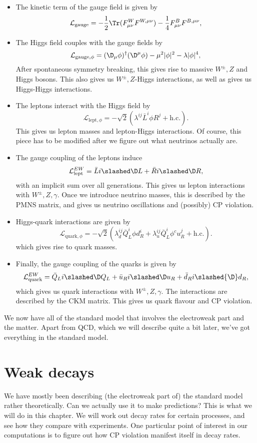 \documentclass[a4paper]{article}
\begin{document}
\begin{itemize}
  \item The kinetic term of the gauge field is given by
    \[
      \mathcal{L}_{\mathrm{gauge}} = -\frac{1}{2} \Tr (F^W_{\mu\nu} F^{W,\mu\nu}) - \frac{1}{4} F_{\mu\nu}^B F^{B, \mu\nu},
    \]
  \item The Higgs field couples with the gauge fields by
    \[
      \mathcal{L}_{\mathrm{gauge}, \phi} = (\D_\mu \phi)^\dagger (\D^\mu \phi) - \mu^2 |\phi|^2 - \lambda |\phi|^4,
    \]
    After spontaneous symmetry breaking, this gives rise to massive $W^{\pm}, Z$ and Higgs bosons. This also gives us $W^{\pm}, Z$-Higgs interactions, as well as gives us Higgs-Higgs interactions.
  \item The leptons interact with the Higgs field by
    \[
      \mathcal{L}_{\mathrm{lept}, \phi} =- \sqrt{2} (\lambda^{ij} \bar L^i \phi R^j + \mathrm{h.c.}).
    \]
    This gives us lepton masses and lepton-Higgs interactions. Of course, this piece has to be modified after we figure out what neutrinos actually are.
  \item The gauge coupling of the leptons induce
    \[
      \mathcal{L}_{\mathrm{lept}}^{EW} = \bar L i \slashed \D L + \bar R i \slashed \D R,
    \]
    with an implicit sum over all generations. This gives us lepton interactions with $W^{\pm}, Z, \gamma$. Once we introduce neutrino masses, this is described by the PMNS matrix, and gives us neutrino oscillations and (possibly) CP violation.
  \item Higgs-quark interactions are given by
    \[
      \mathcal{L}_{\mathrm{quark}, \phi} = - \sqrt{2} (\lambda_d^{ij} \bar{Q}_L^i \phi d_R^i + \lambda_u^{ij} \bar{Q}_L^i \phi^c u_R^j + \mathrm{h.c.}).
    \]
    which gives rise to quark masses.
  \item Finally, the gauge coupling of the quarks is given by
    \[
      \mathcal{L}_{\mathrm{quark}}^{EW} = \bar{Q}_L i \slashed \D Q_L + \bar{u}_R i \slashed\D u_R + \bar{d}_R i \slashed{\D} d_R,
    \]
    which gives us quark interactions with $W^{\pm}, Z, \gamma$. The interactions are described by the CKM matrix. This gives us quark flavour and CP violation.
\end{itemize}

We now have all of the standard model that involves the electroweak part and the matter. Apart from QCD, which we will describe quite a bit later, we've got everything in the standard model.

\section{Weak decays}
We have mostly been describing (the electroweak part of) the standard model rather theoretically. Can we actually use it to make predictions? This is what we will do in this chapter. We will work out decay rates for certain processes, and see how they compare with experiments. One particular point of interest in our computations is to figure out how CP violation manifest itself in decay rates.
\end{document}
